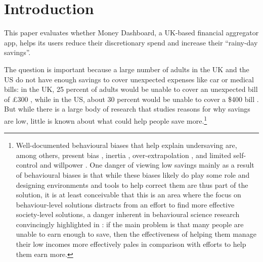 
\section{Introduction}%
\label{sec:introduction}

This paper evaluates whether Money Dashboard, a UK-based financial aggregator
app, helps its users reduce their discretionary spend and increase their
``rainy-day savings''.

The question is important because a large number of adults in the UK and the US
do not have enough savings to cover unexpected expenses like car or medical
bills: in the UK, 25 percent of adults would be unable to cover an unexpected
bill of \pounds300 \citep{philipps2021supporting}, while in the US, about 30
percent would be unable to cover a \$400 bill \citep{fed2022economic}. But
while there is a large body of research that studies reasons for why savings
are low, little is known about what could help people save
more.\footnote{Well-documented behavioural biases that help explain undersaving
    are, among others, present bias \citep{laibson1997golden,
    laibson2019intertemporal}, inertia \citep{madrian2001power},
    over-extrapolation \citep{choi2009reinforcement}, and limited self-control
    and willpower \citep{thaler1981economic, benhabib2005modeling,
    fudenberg2006dual, loewenstein2004animal, gul2001temptation}. One danger of
    viewing low savings mainly as a result of behavioural biases is that while
    these biases likely do play some role and designing environments and tools
    to help correct them are thus part of the solution, it is at least
    conceivable that this is an area where the focus on behaviour-level
    solutions distracts from an effort to find more effective society-level
    solutions, a danger inherent in behavioural science research convincingly
    highlighted in \citet{chater2022frame}: if the main problem is that many
people are unable to earn enough to save, then the effectiveness of helping
them manage their low incomes more effectively pales in comparison with efforts
to help them earn more.}

